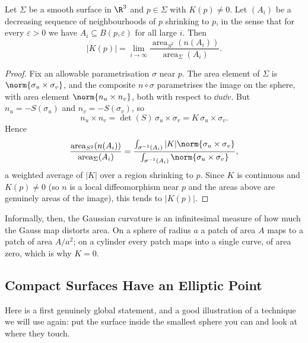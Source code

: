 \begin{theorem}
    Let $\Sigma$ be a smooth surface in $\R^3$ and $p \in \Sigma$ with $K(p) \neq 0$. Let $(A_i)$ be a decreasing sequence of neighbourhoods of $p$ shrinking to $p$, in the sense that for every $\varepsilon>0$ we have $A_i \subseteq B(p,\varepsilon)$ for all large $i$. Then
    $$
    |K(p)| = \lim_{i \to \infty}\frac{\operatorname{area}_{S^2}(n(A_i))}{\operatorname{area}_\Sigma(A_i)}.
    $$
\end{theorem}
\begin{proof}
    Fix an allowable parametrisation $\sigma$ near $p$. The area element of $\Sigma$ is $\norm{\sigma_u \times \sigma_v}$, and the composite $n\circ\sigma$ parametrises the image on the sphere, with area element $\norm{n_u \times n_v}$, both with respect to $\dd u \dd v$. But $n_u = -S(\sigma_u)$ and $n_v = -S(\sigma_v)$, so
    $$
    n_u \times n_v = \det(S)\, \sigma_u \times \sigma_v = K\, \sigma_u\times\sigma_v.
    $$
    Hence
    $$
    \frac{\operatorname{area}_{S^2}(n(A_i))}{\operatorname{area}_\Sigma(A_i)} = \frac{\int_{\sigma^{-1}(A_i)} |K| \norm{\sigma_u\times\sigma_v}}{\int_{\sigma^{-1}(A_i)}\norm{\sigma_u\times\sigma_v}},
    $$
    a weighted average of $|K|$ over a region shrinking to $p$. Since $K$ is continuous and $K(p)\neq 0$ (so $n$ is a local diffeomorphism near $p$ and the areas above are genuinely areas of the image), this tends to $|K(p)|$.
\end{proof}

Informally, then, the Gaussian curvature is an infinitesimal measure of how much the Gauss map distorts area. On a sphere of radius $a$ a patch of area $A$ maps to a patch of area $A/a^2$; on a cylinder every patch maps into a single curve, of area zero, which is why $K = 0$.

\subsection{Compact Surfaces Have an Elliptic Point}

Here is a first genuinely global statement, and a good illustration of a technique we will use again: put the surface inside the smallest sphere you can and look at where they touch.

